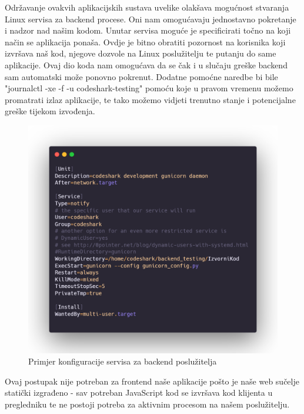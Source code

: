 			Održavanje ovakvih aplikacijskih sustava uvelike olakšava mogućnost stvaranja Linux servisa za backend procese. Oni nam omogućavaju jednostavno pokretanje i nadzor nad našim kodom.
			Unutar servisa moguće je specificirati točno na koji način se aplikacija ponaša. Ovdje je bitno obratiti pozornost na korisnika koji izvršava naš kod, njegove dozvole na Linux poslužitelju te putanju do same aplikacije.
			Ovaj dio koda nam omogućava da se čak i u slučaju greške backend sam automatski može ponovno pokrenut. Dodatne pomoćne naredbe bi bile "journalctl -xe -f -u codeshark-testing" pomoću koje u pravom vremenu možemo promatrati izlaz aplikacije, te tako možemo vidjeti trenutno stanje i potencijalne greške tijekom izvođenja.
			
			\begin{figure}[H]
				\includegraphics[width=\textwidth]{slike/backendServis.png} %
				\caption{Primjer konfiguracije servisa za backend poslužitelja}
				\label{fig:DijagramRazmještaja} %
			\end{figure}
			
			Ovaj postupak nije potreban za frontend naše aplikacije pošto je naše web sučelje statički izgrađeno - sav potreban JavaScript kod se izvršava kod klijenta u pregledniku te ne postoji potreba za aktivnim procesom na našem poslužitelju.
			
			\eject
			
			
			\eject 